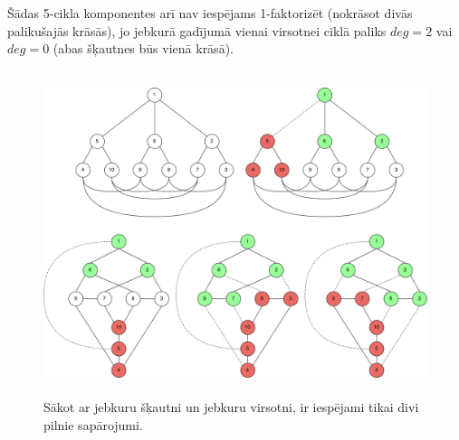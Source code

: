 \documentclass[12pt, a4paper]{article}
\begin{document}
Šādas 5-cikla komponentes arī nav iespējams 1-faktorizēt (nokrāsot divās palikušajās krāsās), jo jebkurā gadījumā vienai virsotnei ciklā paliks $deg=2$ vai $deg=0$ (abas šķautnes būs vienā krāsā).


\begin{figure}[h!]
    \centering
    \includegraphics[height=9.5cm,page=1]{task3.jpeg}
    \caption{Sākot ar jebkuru šķautni un jebkuru virsotni, ir iespējami tikai divi pilnie sapārojumi.}
\end{figure}
\end{document}

